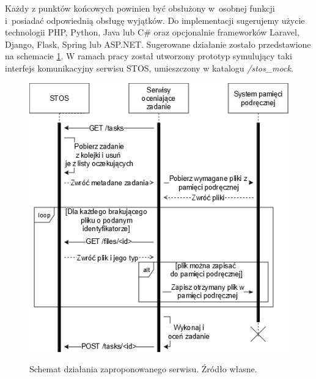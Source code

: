 Każdy z punktów końcowych powinien być obsłużony w~osobnej funkcji i~posiadać odpowiednią obsługę wyjątków. Do implementacji sugerujemy użycie technologii PHP, Python, Java lub C\# oraz opcjonalnie frameworków Laravel, Django, Flask, Spring lub ASP.NET. Sugerowane działanie zostało przedstawione na schemacie \ref{stos-suggestion}. W ramach pracy został utworzony prototyp symulujący taki interfejs komunikacyjny serwisu STOS, umieszczony w katalogu \textit{/stos\_mock}.
\begin{figure}[!h]
	\begin{center}
		\resizebox{0.8\textwidth}{!} {
			\includegraphics{img/5/stos-suggestion.png}
		}
		\caption[Schemat działania zaproponowanego serwisu. Źródło własne.]{Schemat działania zaproponowanego serwisu. Źródło własne.}
    \label{stos-suggestion}
	\end{center}
\end{figure}

